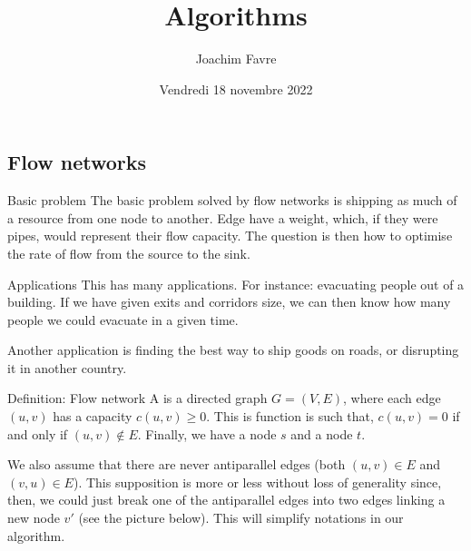 \documentclass[a4paper]{article}
\title{Algorithms}
\author{Joachim Favre}
\date{Vendredi 18 novembre 2022}
\begin{document}
\maketitle


\subsection{Flow networks}
\begin{parag}{Basic problem}
    The basic problem solved by flow networks is shipping as much of a resource from one node to another. Edge have a weight, which, if they were pipes, would represent their flow capacity. The question is then how to optimise the rate of flow from the source to the sink.

    \begin{subparag}{Applications}
        This has many applications. For instance: evacuating people out of a building. If we have given exits and corridors size, we can then know how many people we could evacuate in a given time.

        Another application is finding the best way to ship goods on roads, or disrupting it in another country.
    \end{subparag}
\end{parag}

\begin{parag}{Definition: Flow network}
    A  is a directed graph $G = \left(V, E\right)$, where each edge $\left(u, v\right)$ has a capacity $c\left(u, v\right) \geq 0$. This is function is such that, $c\left(u, v\right) = 0$ if and only if $\left(u, v\right) \not\in E$. Finally, we have a  node $s$ and a  node $t$.

    We also assume that there are never antiparallel edges (both $\left(u, v\right) \in E$ and $\left(v, u\right) \in E$). This supposition is more or less without loss of generality since, then, we could just break one of the antiparallel edges into two edges linking a new node $v'$ (see the picture below). This will simplify notations in our algorithm.

\end{parag}
\end{document}
